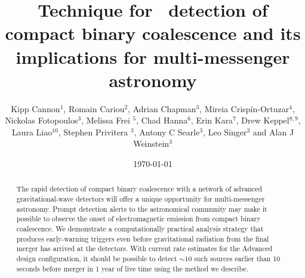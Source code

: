 \documentclass{iopart}
\begin{document}
\title[Early-warning detection of compact binary coalescence]{Technique for \earlywarning\ detection of compact binary
coalescence and its implications for multi-messenger astronomy}

\date{\today}

\author{Kipp Cannon$^{1}$, Romain Cariou$^{2}$, Adrian Chapman$^3$, Mireia
Crisp\'{i}n-Ortuzar$^4$, Nickolas Fotopoulos$^3$, Melissa Frei $^5$, Chad
Hanna$^{6}$, Erin Kara$^{7}$, Drew Keppel$^{8,9}$, Laura Liao$^{10}$, Stephen
Privitera $^3$, Antony C Searle$^3$, Leo Singer$^3$ and Alan J  Weinstein$^3$}

\address{$^1$ Canadian Institute for Theoretical Astrophysics, Toronto, ON,
Canada}
\address{$^2$  D\'{e}partement de physique, \'{E}cole Normale Sup\'{e}rieure de Cachan, Cachan, France}
\address{$^3$ LIGO Laboratory - California Institute of Technology, Pasadena,
CA, USA} 
\address{$^4$ Facultat de F\'{i}sica, Universitat de Val\`{e}ncia, Burjassot,
Spain} 
\address{$^5$ The University of Texas at Austin, Austin, TX, USA}
\address{$^6$ Perimeter Institute for Theoretical Physics, Waterloo, ON,
Canada} 
\address{$^7$ Department of Physics and Astronomy, Barnard College, Columbia
University, New York, NY, USA} 
\address{$^8$ Albert-Einstein-Institut, Max-Planck-Institut f\"{u}r
Gravitationphysik, Hannover, Germany} 
\address{$^9$ Leibniz Universit\"{a}t Hannover, Hannover, Germany}
\address{$^{10}$ Ryerson University, Toronto, ON, Canada}

\begin{abstract}
The rapid detection of compact binary coalescence with a network of advanced
gravitational-wave detectors will offer a unique opportunity for
multi-messenger astronomy.  Prompt detection alerts to the astronomical
community may make it possible to observe the onset of electromagnetic emission
from compact binary coalescence.  We demonstrate a computationally practical
analysis strategy that produces early-warning triggers even before
gravitational radiation from the final merger has arrived at the detectors.
With current rate estimates for the Advanced \LIGO{} design configuration, it
should be possible to detect $\sim$10 such sources earlier than 10 seconds
before merger in 1 year of live time using the method we describe.
\end{abstract}





\end{document}
